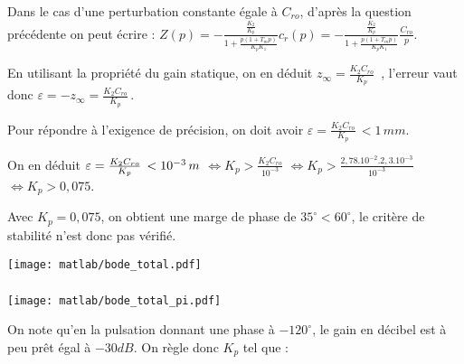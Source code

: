 Dans le cas d'une perturbation constante égale à $C_{ro}$, d'après la question précédente on peut écrire :  
$
Z(p) =  - \frac{{\frac{{{K_2}}}{{{K_p}}}}}{{1 + \frac{{p(1 + {T_m}p)}}{{{K_p}{K_1}}}}}{c_r}(p) = - \frac{{\frac{{{K_2}}}{{{K_p}}}}}{{1 + \frac{{p(1 + {T_m}p)}}{{{K_p}{K_1}}}}}\frac{{{C_{ro}}}}{p}$.

En utilisant la propriété du gain statique, on en déduit ${z_\infty } =  \frac{{{K_2}{C_{ro}}}}{{{K_p}}}\,$ , l'erreur vaut donc  $\varepsilon  =  -{z_\infty }= \frac{{{K_2}{C_{ro}}}}{{{K_p}}}\,$.

Pour répondre à l'exigence de précision, on doit avoir $\varepsilon  = \frac{{{K_2}{C_{ro}}}}{{{K_p}}}\, < 1\,mm$.

On en déduit $
\varepsilon  =  \frac{{{K_2}{C_{ro}}}}{{{K_p}}}\, < {10^{ - 3}}\,m\\$
$\Leftrightarrow {K_p} > \frac{{{K_2}{C_{ro}}}}{{{{10}^{ - 3}}}}$
$\Leftrightarrow {K_p} > \frac{{{{2,78.10}^{ - 2}}{{.2,3.10}^{ - 3}}}}{{{{10}^{ - 3}}}}$
$\Leftrightarrow 
{K_p} > 0,075$.




\question{}%

Avec $K_p=0,075$, on obtient une marge de phase de $35^{\circ}<60^{\circ}$, le critère de stabilité n'est donc pas vérifié.

\begin{center}
\texttt{[image: matlab/bode\_total.pdf]}
\end{center}

\subparagraph{}%

\begin{center}
\texttt{[image: matlab/bode\_total\_pi.pdf]}
\end{center}

\question{}%

On note qu'en la pulsation donnant une phase à $-120^{\circ}$, le gain en décibel est à peu prêt égal à $-30dB$. On règle donc $K_p$ tel que :

